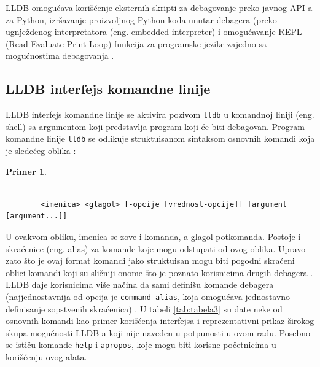 \documentclass[a4paper]{article}
\newtheorem{primer}{Primer}[section]
\begin{document}
LLDB omogućava korišćenje eksternih skripti za debagovanje
preko javnog API-a za Python, izršavanje proizvoljnog Python koda unutar
debagera \cite{lldb_python} (preko ugnježdenog interpretatora (eng. embedded
interpreter) i omogućavanje REPL (Read-Evaluate-Print-Loop) funkcija za
programske jezike zajedno sa mogućnostima debagovanja \cite{swift_lldb_repl}.

\subsection{LLDB interfejs komandne linije}
LLDB interfejs komandne linije se aktivira pozivom \verb|lldb| u komandnoj
liniji (eng. shell) sa argumentom koji predstavlja program koji će biti
debagovan. Program komandne linije \verb|lldb| se odlikuje struktuisanom
sintaksom osnovnih komandi koja je sledećeg oblika \cite{lldb_tutorial}:
\begin{primer}
	\begin{footnotesize}
		\begin{verbatim}
		
		<imenica> <glagol> [-opcije [vrednost-opcije]] [argument [argument...]]
		\end{verbatim}
	\end{footnotesize}
\end{primer}
U ovakvom obliku, imenica se zove i komanda, a glagol potkomanda. Postoje i
skraćenice (eng. alias) za komande koje mogu odstupati od ovog oblika. Upravo
zato što je ovaj format komandi jako struktuisan mogu biti pogodni skraćeni
oblici komandi koji su sličniji onome što je poznato korisnicima drugih debagera
\cite{apple_lldb_comms}. LLDB daje korisnicima više načina da sami definišu
komande debagera (najjednostavnija od opcija je \verb|command alias|, koja
omogućava jednostavno definisanje sopstvenih skraćenica) \cite{book}. U tabeli
\ref{tab:tabela3} su date neke od osnovnih komandi kao primer korišćenja
interfejsa i reprezentativni prikaz širokog skupa mogućnosti LLDB-a koji nije
naveden u potpunosti u ovom radu. Posebno se ističu komande \verb|help| i
\verb|apropos|, koje mogu biti korisne početnicima u korišćenju ovog alata.
\end{document}
